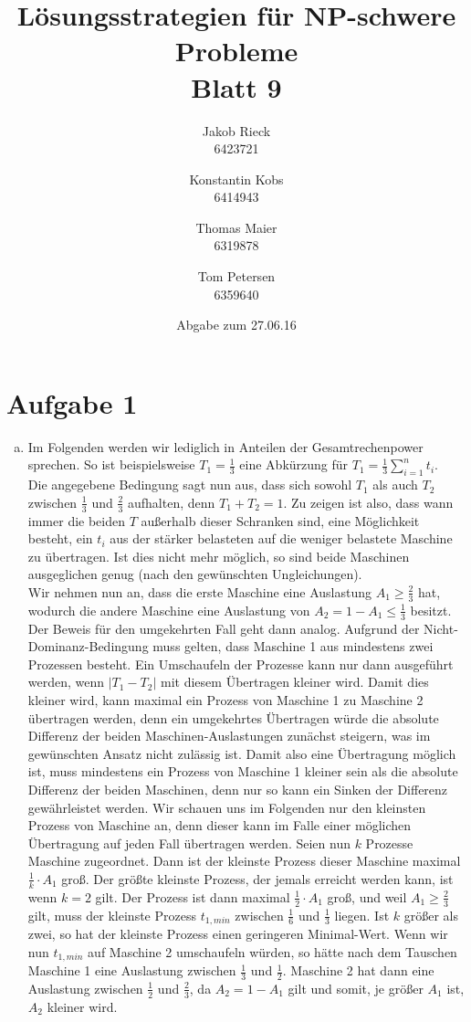 \documentclass[12pt,a4paper]{article}
\title{Lösungsstrategien für NP-schwere Probleme\\Blatt 9}
\author{
		Jakob Rieck\\
		\small{6423721}
	\and
		Konstantin Kobs\\
		\small{6414943}
	\and
		Thomas Maier\\
		\small{6319878}
	\and
		Tom Petersen\\
		\small{6359640}
}
\date{Abgabe zum 27.06.16}
\begin{document}
\maketitle

\section*{Aufgabe 1}

\begin{enumerate}[a)]
	\item Im Folgenden werden wir lediglich in Anteilen der Gesamtrechenpower sprechen. So ist beispielsweise $T_1 = \frac{1}{3}$ eine Abkürzung für $T_1 = \frac{1}{3} \sum_{i=1}^{n} t_i$.\\
		Die angegebene Bedingung sagt nun aus, dass sich sowohl $T_1$ als auch $T_2$ zwischen $\frac{1}{3}$ und $\frac{2}{3}$ aufhalten, denn $T_1 + T_2 = 1$. Zu zeigen ist also, dass wann immer die beiden $T$ außerhalb dieser Schranken sind, eine Möglichkeit besteht, ein $t_i$ aus der stärker belasteten auf die weniger belastete Maschine zu übertragen. Ist dies nicht mehr möglich, so sind beide Maschinen ausgeglichen genug (nach den gewünschten Ungleichungen).\\
		Wir nehmen nun an, dass die erste Maschine eine Auslastung $A_1 \geq \frac{2}{3}$ hat, wodurch die andere Maschine eine Auslastung von $A_2 = 1 - A_1 \leq \frac{1}{3}$ besitzt. Der Beweis für den umgekehrten Fall geht dann analog. Aufgrund der Nicht-Dominanz-Bedingung muss gelten, dass Maschine 1 aus mindestens zwei Prozessen besteht. Ein Umschaufeln der Prozesse kann nur dann ausgeführt werden, wenn $|T_1 - T_2|$ mit diesem Übertragen kleiner wird. Damit dies kleiner wird, kann maximal ein Prozess von Maschine 1 zu Maschine 2 übertragen werden, denn ein umgekehrtes Übertragen würde die absolute Differenz der beiden Maschinen-Auslastungen zunächst steigern, was im gewünschten Ansatz nicht zulässig ist. Damit also eine Übertragung möglich ist, muss mindestens ein Prozess von Maschine 1 kleiner sein als die absolute Differenz der beiden Maschinen, denn nur so kann ein Sinken der Differenz gewährleistet werden. Wir schauen uns im Folgenden nur den kleinsten Prozess von Maschine an, denn dieser kann im Falle einer möglichen Übertragung auf jeden Fall übertragen werden. Seien nun $k$ Prozesse Maschine zugeordnet. Dann ist der kleinste Prozess dieser Maschine maximal $\frac{1}{k} \cdot A_1$ groß. Der größte kleinste Prozess, der jemals erreicht werden kann, ist wenn $k=2$ gilt. Der Prozess ist dann maximal $\frac{1}{2} \cdot A_1$ groß, und weil $A_1 \geq \frac{2}{3}$ gilt, muss der kleinste Prozess $t_{1,min}$ zwischen $\frac{1}{6}$ und $\frac{1}{3}$ liegen. Ist $k$ größer als zwei, so hat der kleinste Prozess einen geringeren Minimal-Wert. Wenn wir nun $t_{1,min}$ auf Maschine 2 umschaufeln würden, so hätte nach dem Tauschen Maschine 1 eine Auslastung zwischen $\frac{1}{3}$ und $\frac{1}{2}$. Maschine 2 hat dann eine Auslastung zwischen $\frac{1}{2}$ und $\frac{2}{3}$, da $A_2 = 1 - A_1$ gilt und somit, je größer $A_1$ ist, $A_2$ kleiner wird.\\

\end{enumerate}
\end{document}
